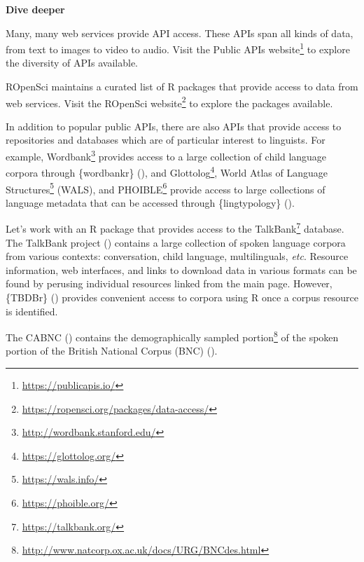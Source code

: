 \documentclass[
  letterpaper,
  krantz1]{latex/krantz-mod}
\theoremstyle{definition}
\theoremstyle{definition}
\theoremstyle{remark}
\DeclareRobustCommand{\href}[2]{#2\footnote{\url{#1}}}
\begin{document}
\begin{tcolorbox}[enhanced jigsaw, toprule=.15mm, breakable, colback=white, arc=.35mm, left=2mm, colframe=quarto-callout-color-frame, opacityback=0, bottomrule=.15mm, rightrule=.15mm, leftrule=.75mm]

\textbf{ Dive deeper}

Many, many web services provide API access. These APIs span all kinds of
data, from text to images to video to audio. Visit the
\href{https://publicapis.io/}{Public APIs website} to explore the
diversity of APIs available.

ROpenSci  maintains a curated list of R packages that
provide access to data from web services. Visit the
\href{https://ropensci.org/packages/data-access/}{ROpenSci website} to
explore the packages available.

\end{tcolorbox}

In addition to popular public APIs, there are also APIs that provide
access to repositories and databases which are of particular interest to
linguists. For example, \href{http://wordbank.stanford.edu/}{Wordbank}
provides access to a large collection of child language corpora through
\{wordbankr\} (), and
\href{https://glottolog.org/}{Glottolog},
\href{https://wals.info/}{World Atlas of Language Structures} (WALS),
and \href{https://phoible.org/}{PHOIBLE} provide access to large
collections of language metadata that can be accessed through
\{lingtypology\} ().

Let's work with an R package that provides access to the
\href{https://talkbank.org/}{TalkBank} database. The
TalkBank project ()
contains a large collection of spoken language corpora from various
contexts: conversation, child language, multilinguals, \emph{etc}.
Resource information, web interfaces, and links to download data in
various formats can be found by perusing individual resources linked
from the main page. However, \{TBDBr\} () provides convenient access to corpora using R once
a corpus resource is
identified.

The CABNC () contains the
\href{http://www.natcorp.ox.ac.uk/docs/URG/BNCdes.html}{demographically
sampled portion} of the spoken portion of the British National Corpus
(BNC) ().
\end{document}
